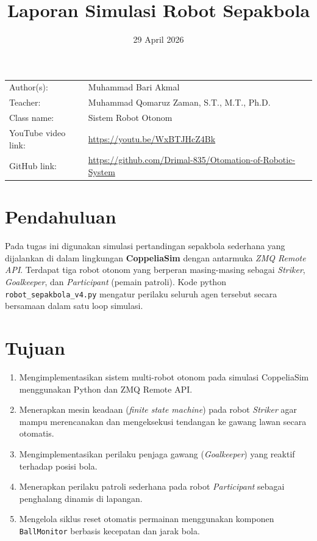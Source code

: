 \documentclass{article}
\title{Laporan Simulasi Robot Sepakbola}
\date{29 April 2026}
\begin{document}
\maketitle

\noindent\begin{tabular}{@{}ll}
    Author(s): & Muhammad Bari Akmal\\
    Teacher:   & Muhammad Qomaruz Zaman, S.T., M.T., Ph.D.\\
    Class name: & Sistem Robot Otonom\\
    YouTube video link: & \url{https://youtu.be/WxBTJHcZ4Bk} \\
    GitHub link: & \url{https://github.com/Drimal-835/Otomation-of-Robotic-System}
\end{tabular}
\vspace{2cm}

\section{Pendahuluan}

Pada tugas ini digunakan simulasi pertandingan sepakbola sederhana yang dijalankan
di dalam lingkungan \textbf{CoppeliaSim} dengan antarmuka \textit{ZMQ Remote API}.
Terdapat tiga robot otonom yang berperan masing-masing sebagai \textit{Striker},
\textit{Goalkeeper}, dan \textit{Participant} (pemain patroli). Kode python
\texttt{robot\_sepakbola\_v4.py} mengatur perilaku seluruh agen tersebut secara
bersamaan dalam satu loop simulasi.

\section{Tujuan}

\begin{enumerate}
    \item Mengimplementasikan sistem multi-robot otonom pada simulasi CoppeliaSim
          menggunakan Python dan ZMQ Remote API.
    \item Menerapkan mesin keadaan (\textit{finite state machine}) pada robot
          \textit{Striker} agar mampu merencanakan dan mengeksekusi tendangan ke
          gawang lawan secara otomatis.
    \item Mengimplementasikan perilaku penjaga gawang (\textit{Goalkeeper}) yang
          reaktif terhadap posisi bola.
    \item Menerapkan perilaku patroli sederhana pada robot \textit{Participant}
          sebagai penghalang dinamis di lapangan.
    \item Mengelola siklus reset otomatis permainan menggunakan komponen
          \texttt{BallMonitor} berbasis kecepatan dan jarak bola.
\end{enumerate}
\end{document}
